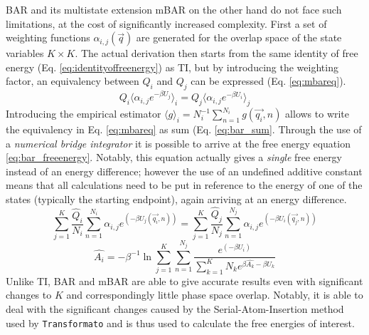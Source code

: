 \documentclass[oneside]{scrreprt}
\begin{document}
BAR and its multistate extension mBAR on the other hand do not face such limitations, at the cost of significantly increased complexity. First a set of weighting functions $\alpha_{i,j} (\Vec{q})$ are generated for the overlap space of the state variables $K \times K$. The actual derivation then starts from the same identity of free energy (Eq. \ref{eq:identityoffreenergy}) as TI, but by introducing the weighting factor, an equivalency between $Q_i$ and $Q_j$ can be expressed (Eq. \ref{eq:mbareq}).
\begin{equation} \label{eq:mbareq}
    Q_i\langle \alpha_{i,j} e^{-\beta U_j}\rangle_i = Q_j \langle \alpha_{i,j} e^{-\beta U_i} \rangle_j
\end{equation}
Introducing the empirical estimator $\langle g \rangle_i = N_i^{-1} \sum_{n=1}^{N_i} g(\Vec{q_i},n)$ allows to write the equivalency in Eq. \ref{eq:mbareq} as sum (Eq. \ref{eq:bar_sum}. Through the use of a \emph{numerical bridge integrator} \cite{tan_likelihood_2004} it is possible to arrive at the free energy equation \ref{eq:bar_freeenergy}. Notably, this equation actually gives a \emph{single} free energy instead of an energy difference; however the use of an undefined additive constant means that all calculations need to be put in reference to the energy of one of the states (typically the starting endpoint), again arriving at an energy difference.
\begin{equation} \label{eq:bar_sum}
    \sum^K_{j=1}\frac{\hat{Q}_i}{N_i} \sum_{n=1}^{N_i} \alpha_{i,j} e^{(-\beta U_j(\Vec{q_i},n))} = \sum^K_{j=1}\frac{\hat{Q}_j}{N_j} \sum_{n=1}^{N_j} \alpha_{i,j} e^{(-\beta U_i(\Vec{q_j},n))}
\end{equation}
\begin{equation} \label{eq:bar_freeenergy}
\hat{A_i}= -\beta^{-1} \ln{\sum^K_{j=1} \sum^{N_j}_{n=1}\frac{e^{(-\beta U_i)}}{\sum^K_{k=1} N_k e^{\beta \hat{A_k}-\beta U_k}}}   
\end{equation}
Unlike TI, BAR and mBAR are able to give accurate results even with significant changes to $K$ and correspondingly little phase space overlap. Notably, it is able to deal with the significant changes caused by the Serial-Atom-Insertion method used by \texttt{Transformato} and is thus used to calculate the free energies of interest.
\end{document}
